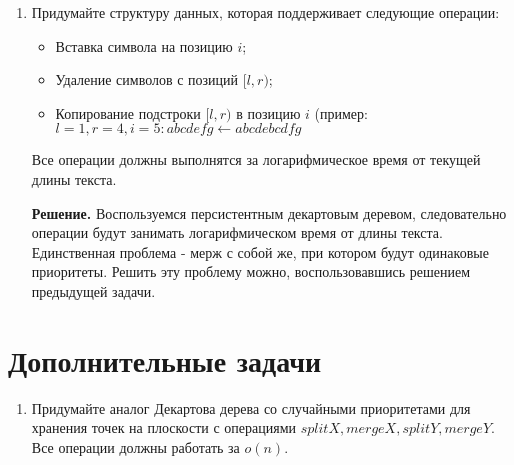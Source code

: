 \begin{enumerate}
	\item Придумайте структуру данных, которая поддерживает следующие операции:
	
	\begin{itemize}
		\item Вставка символа на позицию $i$;
		\item Удаление символов с позиций $[l, r)$;
		\item Копирование подстроки $[l, r)$ в позицию $i$ (пример: $l = 1, r = 4, i = 5 : abcdefg \leftarrow abcdebcdfg$
	\end{itemize}
	
	Все операции должны выполнятся за логарифмическое время от текущей длины текста.
	
	\textbf{Решение.}
	Воспользуемся персистентным декартовым деревом, следовательно операции будут занимать логарифмическом время от длины текста. Единственная проблема - мерж с собой же, при котором будут одинаковые приоритеты. Решить эту проблему можно, воспользовавшись решением предыдущей задачи.
	
\end{enumerate}

\section*{Дополнительные задачи}
\begin{enumerate}
	\item Придумайте аналог Декартова дерева со случайными приоритетами для хранения точек на плоскости с операциями $splitX, mergeX, splitY, mergeY$. Все операции должны работать за $o(n)$.
\end{enumerate}

